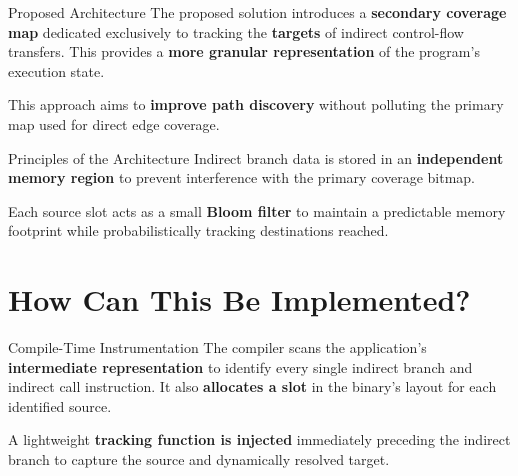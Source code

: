 \documentclass[aspectratio=169]{beamer}
\begin{document}
  \begin{frame}{Proposed Architecture}
    The proposed solution introduces a \textbf{secondary coverage map} dedicated exclusively to tracking the \textbf{targets} of indirect control-flow transfers. This provides a \textbf{more granular representation} of the program's execution state.


    This approach aims to \textbf{improve path discovery} without polluting the primary map used for direct edge coverage.
  \end{frame}

  \begin{frame}{Principles of the Architecture}
    Indirect branch data is stored in an \textbf{independent memory region} to prevent interference with the primary coverage bitmap.


    Each source slot acts as a small \textbf{Bloom filter} to maintain a predictable memory footprint while probabilistically tracking destinations reached.


    \begin{center}
        \hspace*{-1.65cm}
        
    \end{center}
  \end{frame}

  \section{How Can This Be Implemented?}
  
  \begin{frame}{Compile-Time Instrumentation}
    The compiler scans the application's \textbf{intermediate representation} to identify every single indirect branch and indirect call instruction. It also \textbf{allocates a slot} in the binary's layout for each identified source.

    \begin{center}
      
    \end{center}
    
    A lightweight \textbf{tracking function is injected} immediately preceding the indirect branch to capture the source and dynamically resolved target.
  \end{frame}
\end{document}
